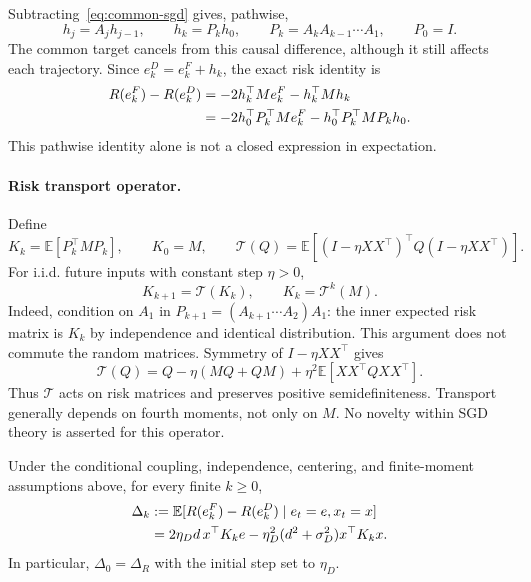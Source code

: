 Subtracting~\eqref{eq:common-sgd} gives, pathwise,
\begin{equation}
    h_j=A_jh_{j-1},\qquad h_k=P_kh_0,\qquad
    P_k=A_kA_{k-1}\cdots A_1,\qquad P_0=I.
    \label{eq:transport-path}
\end{equation}
The common target cancels from this causal difference, although it still
affects each trajectory. Since $e_k^D=e_k^F+h_k$, the exact risk identity is
\begin{align}
    R(e_k^F)-R(e_k^D)
    &=-2h_k^\top Me_k^F-h_k^\top Mh_k\notag\\
    &=-2h_0^\top P_k^\top Me_k^F
      -h_0^\top P_k^\top MP_kh_0.
    \label{eq:pathwise-risk-gap}
\end{align}
This pathwise identity alone is not a closed expression in expectation.

\paragraph{Risk transport operator.}
Define
\begin{equation}
    K_k=\mathbb E[P_k^\top MP_k],\qquad K_0=M,\qquad
    \mathcal T(Q)=\mathbb E[(I-\eta XX^\top)^\top Q(I-\eta XX^\top)].
\end{equation}
For i.i.d. future inputs with constant step $\eta>0$,
\begin{equation}
    K_{k+1}=\mathcal T(K_k),\qquad K_k=\mathcal T^k(M).
    \label{eq:transport-operator}
\end{equation}
Indeed, condition on $A_1$ in
$P_{k+1}=(A_{k+1}\cdots A_2)A_1$: the inner expected risk matrix is
$K_k$ by independence and identical distribution. This argument does not
commute the random matrices. Symmetry of $I-\eta XX^\top$ gives
\begin{equation}
    \mathcal T(Q)=Q-\eta(MQ+QM)
       +\eta^2\mathbb E[XX^\top QXX^\top].
    \label{eq:transport-fourth-moment}
\end{equation}
Thus $\mathcal T$ acts on risk matrices and preserves positive
semidefiniteness. Transport generally depends on fourth moments, not only
on $M$. No novelty within SGD theory is asserted for this operator.

\begin{theorem}
Under the conditional coupling, independence, centering, and finite-moment
assumptions above, for every finite $k\geq0$,
\begin{align}
    \Delta_k
    &:=\mathbb E[R(e_k^F)-R(e_k^D)\mid e_t=e,x_t=x]\notag\\
    &=2\eta_D d\,x^\top K_ke
      -\eta_D^2(d^2+\sigma_D^2)x^\top K_kx.
    \label{eq:transported-adaptation}
\end{align}
In particular, $\Delta_0=\Delta_R$ with the initial step set to $\eta_D$.
\end{theorem}

